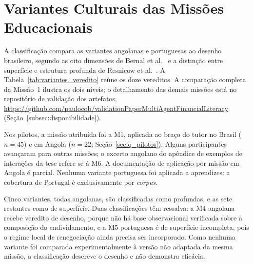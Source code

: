 
\chapter{Variantes Culturais das Missões Educacionais}
\label{apendice:variantes}

A classificação compara as variantes angolanas e portuguesas ao desenho brasileiro, segundo as oito dimensões de Bernal et al.~\cite{bernal1995} e a distinção entre superfície e estrutura profunda de Resnicow et al.~\cite{resnicow1999}. A Tabela~\ref{tab:variantes_veredito} reúne os doze vereditos. A comparação completa da Missão~1 ilustra os dois níveis; o detalhamento das demais missões está no repositório de validação dos artefatos, \url{https://github.com/paulocob/validationPaperMultiAgentFinancialLiteracy} (Seção~\ref{subsec:disponibilidade}).

Nos pilotos, a missão atribuída foi a M1, aplicada ao braço do tutor no Brasil ($n = 45$) e em Angola ($n = 22$; Seção~\ref{sec:q_pilotos}). Alguns participantes avançaram para outras missões; o excerto angolano do apêndice de exemplos de interações da tese refere-se à M6. A documentação de aplicação por missão em Angola é parcial. Nenhuma variante portuguesa foi aplicada a aprendizes: a cobertura de Portugal é exclusivamente por \textit{corpus}.

Cinco variantes, todas angolanas, são classificadas como profundas, e as sete restantes como de superfície. Duas classificações têm ressalva: a M4 angolana recebe veredito de desenho, porque não há base observacional verificada sobre a composição do endividamento, e a M5 portuguesa é de superfície incompleta, pois o regime local de renegociação ainda precisa ser incorporado. Como nenhuma variante foi comparada experimentalmente à versão não adaptada da mesma missão, a classificação descreve o desenho e não demonstra eficácia.

